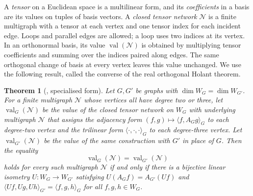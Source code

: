 \documentclass[11pt,a4paper]{article}
\theoremstyle{plain}
\newtheorem*{theorem*}{Theorem}
\theoremstyle{definition}
\DeclareMathOperator{\val}{val}
\begin{document}
A \emph{tensor} on a Euclidean space is a multilinear form, and its
\emph{coefficients} in a basis are its values on tuples of basis
vectors.
A \emph{closed tensor network} $\mathcal N$ is a finite multigraph with a tensor at
each vertex and one tensor index for each incident edge.
Loops and parallel edges are allowed; a loop uses two indices at its vertex.
In an orthonormal basis, its value $\val(\mathcal N)$ is obtained by multiplying
tensor coefficients and summing over the indices paired along edges.
The same orthogonal change of basis at every vertex leaves this value unchanged.
We use the following result, called the converse of the real orthogonal
Holant theorem.
\begin{theorem*}[{\cite[Theorem~9]{Young2025}, specialised form}]
Let $G,G'$ be graphs with $\dim W_G=\dim W_{G'}$.
For a finite multigraph $\mathcal N$ whose vertices all have degree two or
three, let $\val_G(\mathcal N)$ be the value of the closed tensor network
on $W_G$ with underlying multigraph $\mathcal N$ that assigns the adjacency form
$(f,g)\mapsto\langle f,A_Gg\rangle_G$ to each degree-two vertex and
the trilinear form $\langle\cdot,\cdot,\cdot\rangle_G$ to each
degree-three vertex. Let $\val_{G'}(\mathcal N)$ be the value of the same
construction with $G'$ in place of $G$.
Then the equality
\begin{equation}\label{eq:image-all-networks}
 \val_G(\mathcal N)=\val_{G'}(\mathcal N)
\end{equation}
holds for every such multigraph $\mathcal N$ if and only if there is a bijective
linear isometry $U:W_G\to W_{G'}$ satisfying $U(A_Gf)=A_{G'}(Uf)$ and
$\langle Uf,Ug,Uh\rangle_{G'}=\langle f,g,h\rangle_G$ for all $f,g,h\in W_G$.
\end{theorem*}
\end{document}
